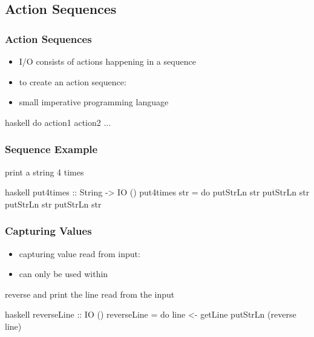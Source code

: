 \documentclass[dvipsnames]{beamer}
\theoremstyle{plain}
\begin{document}
\subsection{Action Sequences}

\begin{frame}[fragile]
  \frametitle{Action Sequences}

  \begin{itemize}
    \item I/O consists of \alert{actions} happening in a sequence
    \item to create an action sequence: 
    \item small imperative programming language
  \end{itemize}

  \begin{block}{}
    \begin{pygments}{haskell}
do
    action1
    action2
    ...
    \end{pygments}
  \end{block}
\end{frame}

\begin{frame}[fragile]
  \frametitle{Sequence Example}

  \begin{exampleblock}{print a string 4 times}
    \begin{pygments}{haskell}
put4times :: String -> IO ()
put4times str = do
    putStrLn str
    putStrLn str
    putStrLn str
    putStrLn str
    \end{pygments}
  \end{exampleblock}
\end{frame}

\begin{frame}[fragile]
  \frametitle{Capturing Values}

  \begin{itemize}
    \item capturing value read from input: 
    \item can only be used within 
  \end{itemize}

  \begin{exampleblock}{reverse and print the line read from the input}
    \begin{pygments}{haskell}
reverseLine :: IO ()
reverseLine = do
    line <- getLine
    putStrLn (reverse line)
    \end{pygments}
  \end{exampleblock}
\end{frame}
\end{document}
